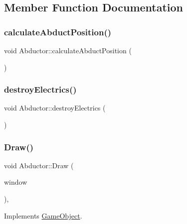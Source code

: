 \subsection{Member Function Documentation}
\hypertarget{class_abductor_a0c9d8d1e2978f6b794de34568baa266e}{}\label{class_abductor_a0c9d8d1e2978f6b794de34568baa266e} 
\subsubsection{\texorpdfstring{calculate\+Abduct\+Position()}{calculateAbductPosition()}}
{\footnotesize\ttfamily void Abductor\+::calculate\+Abduct\+Position (\begin{DoxyParamCaption}{ }\end{DoxyParamCaption})}

\hypertarget{class_abductor_a7a37f57eb3c873e8b944b4757d1d87cd}{}\label{class_abductor_a7a37f57eb3c873e8b944b4757d1d87cd} 
\subsubsection{\texorpdfstring{destroy\+Electrics()}{destroyElectrics()}}
{\footnotesize\ttfamily void Abductor\+::destroy\+Electrics (\begin{DoxyParamCaption}{ }\end{DoxyParamCaption})}

\hypertarget{class_abductor_ab27e1580f1a11d483d97f028deda7370}{}\label{class_abductor_ab27e1580f1a11d483d97f028deda7370} 
\subsubsection{\texorpdfstring{Draw()}{Draw()}}
{\footnotesize\ttfamily void Abductor\+::\+Draw (\begin{DoxyParamCaption}\item[{sf\+::\+Render\+Window \&}]{window }\end{DoxyParamCaption})\hspace{0.3cm}{\ttfamily [override]}, {\ttfamily [virtual]}}



Implements \hyperlink{class_game_object_a0bd45eb831b3d0959eb498cad3e412ce}{Game\+Object}.

